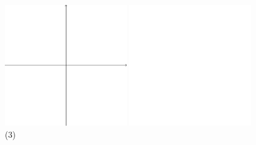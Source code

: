 \documentclass{oblivoir}
\begin{document}
\begin{center}
\includegraphics[width=0.4\textwidth]{xyaxes}\quad
\includegraphics[width=0.4\textwidth]{xynull}\\
(3)\qquad\qquad\qquad\qquad\qquad\qquad\quad\phantom{(4)}
\end{center}
\end{document}
